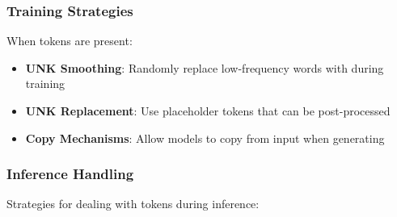 \subsubsection{Training Strategies}
When \unk{} tokens are present:

\begin{itemize}
\item \textbf{UNK Smoothing}: Randomly replace low-frequency words with \unk{} during training
\item \textbf{UNK Replacement}: Use placeholder tokens that can be post-processed
\item \textbf{Copy Mechanisms}: Allow models to copy from input when generating \unk{}
\end{itemize}

\subsubsection{Inference Handling}
Strategies for dealing with \unk{} tokens during inference:

